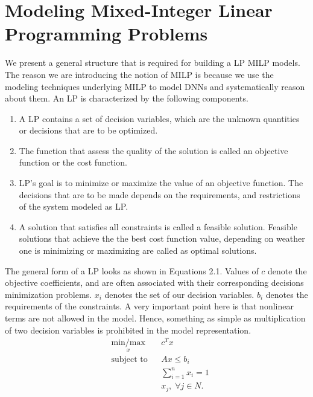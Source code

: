 \section{Modeling Mixed-Integer Linear Programming Problems}
\label{milp}
We present a general structure that is required for building a \ac{LP} \ac{MILP} models.
The reason we are introducing the notion of \ac{MILP} is because we use the modeling techniques underlying \ac{MILP} to model \ac{DNN}s and systematically reason about them. 
An \ac{LP} is characterized by the following components. 

\begin{enumerate}
	\item A \ac{LP} contains a set of decision variables, which are the unknown quantities or decisions that are to be optimized. 
	\item The function that assess the quality of the solution is called an objective function or the cost function.
	\item \ac{LP}'s goal is to minimize or maximize the value of an objective function. 
	The decisions that are to be made depends on the requirements, and restrictions of the  system modeled as \ac{LP}.
	\item A solution that satisfies all constraints is called a feasible solution. 
	Feasible solutions that achieve the the best cost function value, depending on weather one is minimizing or maximizing are called as optimal solutions. 
\end{enumerate}


The general form of a \ac{LP} looks as shown in Equations 2.1. 
Values of $c$ denote the objective coefficients, and are often associated with their corresponding decisions minimization problems. 
$x_i$ denotes the set of our decision variables.
$b_i$ denotes the requirements of the constraints. 
A very important point here is that nonlinear terms are not allowed in the model. 
Hence, something as simple as multiplication of two decision variables is prohibited in the model representation. 
\begin{equation}
\begin{aligned}
& \underset{x}{\text{min/max}}
& & c^T x \\
& \text{subject to} & &  Ax \leq b_i \\
& & &  \sum_{i=1}^{n} x_i =1 \\
& & &  x_j, \; \forall j \in N. \\
\end{aligned}
\end{equation}

